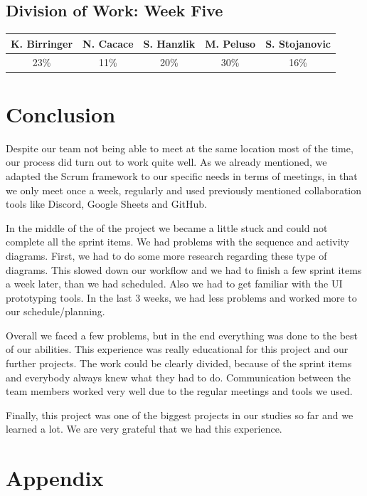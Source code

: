 \documentclass[a4paper, 12pt]{article}
\begin{document}
\subsection{Division of Work: Week Five}

\begin{table}[htbp]
\centering
\setlength{\tabcolsep}{10pt}
\begin{tabular}{|c|c|c|c|c|}
\hline
K. Birringer & N. Cacace & S. Hanzlik & M. Peluso & S. Stojanovic\\
\hline
23\%   &11\%  &20\%  &30\%  &16\%\\
\hline
\end{tabular}
\end{table}


\section{Conclusion}
Despite our team not being able to meet at the same location most of the time, our process did turn out to work quite well. As we already mentioned, we adapted the Scrum framework to our specific needs in terms of meetings, in that we only meet once a week, regularly and used previously mentioned collaboration tools like Discord, Google Sheets and GitHub.


In the middle of the of the project we became a little stuck and could not complete all the sprint items. We had problems with the sequence and activity diagrams. First, we had to do some more research regarding these type of diagrams. This slowed down our workflow and we had to finish a few sprint items a week later, than we had scheduled. Also we had to get familiar with the UI prototyping tools. In the last 3 weeks, we had less problems and worked more to our schedule/planning.

Overall we faced a few problems, but in the end everything was done to the best of our abilities.  This experience was really educational for this project and our further projects. The work could be clearly divided, because of the sprint items and everybody always knew what they had to do. Communication between the team members worked very well due to the regular meetings and tools we used.

Finally, this project was one of the biggest projects in our studies so far and we learned a lot. We are very grateful that we had this experience.


\section{Appendix}


\end{document}
